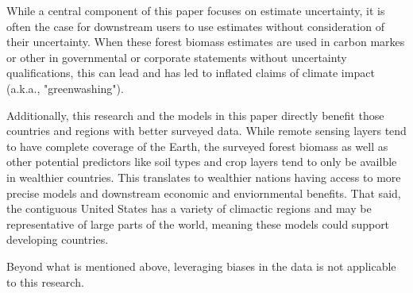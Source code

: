 \documentclass{article}
\begin{document}
While a central component of this paper focuses on estimate uncertainty, it is often the case for downstream users to use estimates without consideration of their uncertainty. When these forest biomass estimates are used in carbon markes or other in governmental or corporate statements without uncertainty qualifications, this can lead and has led to inflated claims of climate impact (a.k.a., "greenwashing").

Additionally, this research and the models in this paper directly benefit those countries and regions with better surveyed data. While remote sensing layers tend to have complete coverage of the Earth, the surveyed forest biomass as well as other potential predictors like soil types and crop layers tend to only be availble in wealthier countries. This translates to wealthier nations having access to more precise models and downstream economic and enviornmental benefits. That said, the contiguous United States has a variety of climactic regions and may be representative of large parts of the world, meaning these models could support developing countries. 

Beyond what is mentioned above, leveraging biases in the data is not applicable to this research. 

{\small


}
\end{document}
